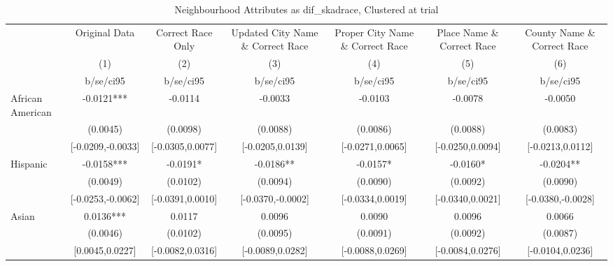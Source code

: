 \documentclass{article}
\begin{document}
\begin{table}[htbp]\centering
\def\sym#1{\ifmmode^{#1}\else\(^{#1}\)\fi}
\caption{Neighbourhood Attributes as dif\_skadrace, Clustered at trial}
\begin{tabular}{l*{6}{c}}
\toprule
                    &\multicolumn{1}{c}{Original Data}&\multicolumn{1}{c}{Correct Race Only}&\multicolumn{1}{c}{Updated City Name \& Correct Race}&\multicolumn{1}{c}{Proper City Name \& Correct Race}&\multicolumn{1}{c}{Place Name \& Correct Race}&\multicolumn{1}{c}{County Name \& Correct Race}\\\cmidrule(lr){2-2}\cmidrule(lr){3-3}\cmidrule(lr){4-4}\cmidrule(lr){5-5}\cmidrule(lr){6-6}\cmidrule(lr){7-7}
                    &\multicolumn{1}{c}{(1)}   &\multicolumn{1}{c}{(2)}   &\multicolumn{1}{c}{(3)}   &\multicolumn{1}{c}{(4)}   &\multicolumn{1}{c}{(5)}   &\multicolumn{1}{c}{(6)}   \\
                    &   b/se/ci95   &   b/se/ci95   &   b/se/ci95   &   b/se/ci95   &   b/se/ci95   &   b/se/ci95   \\
\midrule
African American    &     -0.0121***&     -0.0114   &     -0.0033   &     -0.0103   &     -0.0078   &     -0.0050   \\
                    &    (0.0045)   &    (0.0098)   &    (0.0088)   &    (0.0086)   &    (0.0088)   &    (0.0083)   \\
                    &[-0.0209,-0.0033]   &[-0.0305,0.0077]   &[-0.0205,0.0139]   &[-0.0271,0.0065]   &[-0.0250,0.0094]   &[-0.0213,0.0112]   \\
Hispanic            &     -0.0158***&     -0.0191*  &     -0.0186** &     -0.0157*  &     -0.0160*  &     -0.0204** \\
                    &    (0.0049)   &    (0.0102)   &    (0.0094)   &    (0.0090)   &    (0.0092)   &    (0.0090)   \\
                    &[-0.0253,-0.0062]   &[-0.0391,0.0010]   &[-0.0370,-0.0002]   &[-0.0334,0.0019]   &[-0.0340,0.0021]   &[-0.0380,-0.0028]   \\
Asian               &      0.0136***&      0.0117   &      0.0096   &      0.0090   &      0.0096   &      0.0066   \\
                    &    (0.0046)   &    (0.0102)   &    (0.0095)   &    (0.0091)   &    (0.0092)   &    (0.0087)   \\
                    &[0.0045,0.0227]   &[-0.0082,0.0316]   &[-0.0089,0.0282]   &[-0.0088,0.0269]   &[-0.0084,0.0276]   &[-0.0104,0.0236]   \\

\end{tabular}
\end{table}
\end{document}
